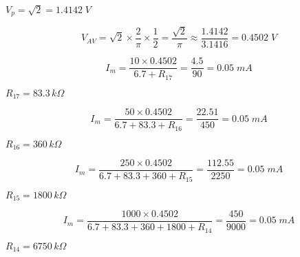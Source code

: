 {\newpage\clearpage
{}%
$V_p=\sqrt{2}=1.4142\;V$%
\lthtmlinlinemathZ
\lthtmlcheckvsize\clearpage}

{\newpage\clearpage
{}%
\begin{displaymath}
  V_{AV}=\sqrt{2}\times \frac{2}{\pi}\times\frac{1}{2}
  =\frac{\sqrt{2}}{\pi}\approx\frac{1.4142}{3.1416}=0.4502\;V
  \end{displaymath}%
\lthtmldisplayZ
\lthtmlcheckvsize\clearpage}

{\newpage\clearpage
{}%
\begin{displaymath}
    I_m=\frac{10\times 0.4502}{6.7+R_{17}}=\frac{4.5}{90}=0.05\;mA
    \end{displaymath}%
\lthtmldisplayZ
\lthtmlcheckvsize\clearpage}

{\newpage\clearpage
{}%
$R_{17}=83.3\,k\Omega$%
\lthtmlinlinemathZ
\lthtmlcheckvsize\clearpage}

{\newpage\clearpage
{}%
\begin{displaymath}
    I_m=\frac{50\times 0.4502}{6.7+83.3+R_{16}}=\frac{22.51}{450}=0.05\;mA
    \end{displaymath}%
\lthtmldisplayZ
\lthtmlcheckvsize\clearpage}

{\newpage\clearpage
{}%
$R_{16}=360\,k\Omega$%
\lthtmlinlinemathZ
\lthtmlcheckvsize\clearpage}

{\newpage\clearpage
{}%
\begin{displaymath}
    I_m=\frac{250\times 0.4502}{6.7+83.3+360+R_{15}}=\frac{112.55}{2250}=0.05\;mA
    \end{displaymath}%
\lthtmldisplayZ
\lthtmlcheckvsize\clearpage}

{\newpage\clearpage
{}%
$R_{15}=1800\,k\Omega$%
\lthtmlinlinemathZ
\lthtmlcheckvsize\clearpage}

{\newpage\clearpage
{}%
\begin{displaymath}
    I_m=\frac{1000\times 0.4502}{6.7+83.3+360+1800+R_{14}}=\frac{450}{9000}=0.05\;mA
    \end{displaymath}%
\lthtmldisplayZ
\lthtmlcheckvsize\clearpage}

{\newpage\clearpage
{}%
$R_{14}=6750\,k\Omega$%
\lthtmlinlinemathZ
\lthtmlcheckvsize\clearpage}

